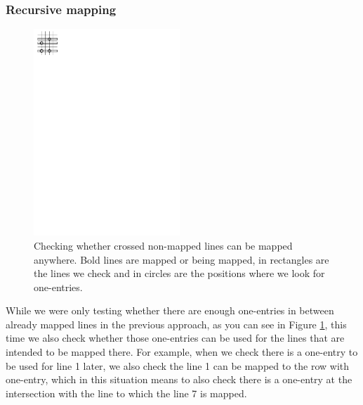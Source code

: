 \subsubsection{Recursive mapping}
\begin{figure}[h!]
\centering
\includegraphics[width=55mm]{../img/recursive.pdf}
\caption{Checking whether crossed non-mapped lines can be mapped anywhere. Bold lines are mapped or being mapped, in rectangles are the lines we check and in circles are the positions where we look for one-entries.}
\label{recursive}
\end{figure}
While we were only testing whether there are enough one-entries in between already mapped lines in the previous approach, as you can see in Figure \ref{recursive}, this time we also check whether those one-entries can be used for the lines that are intended to be mapped there. For example, when we check there is a one-entry to be used for line 1 later, we also check the line 1 can be mapped to the row with one-entry, which in this situation means to also check there is a one-entry at the intersection with the line to which the line 7 is mapped.
